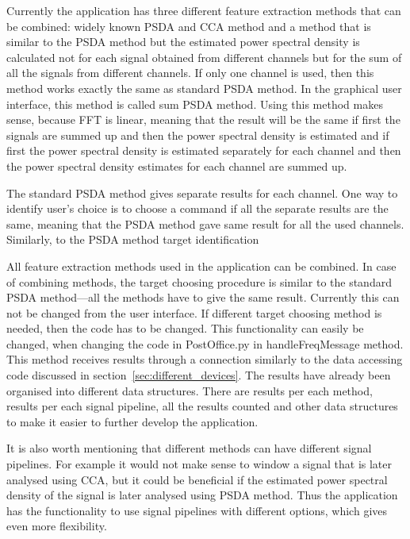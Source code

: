 Currently the application has three different \gls{feature extraction} methods that can be combined: widely known \gls{PSDA} and \gls{CCA} method and a method that is similar to the \gls{PSDA} method but the estimated \gls{power spectral density} is calculated not for each signal obtained from different channels but for the sum of all the signals from different channels. If only one channel is used, then this method works exactly the same as standard \gls{PSDA} method. In the graphical user interface, this method is called sum \gls{PSDA} method. Using this method makes sense, because \gls{FFT} is linear, meaning that the result will be the same if first the signals are summed up and then the \gls{power spectral density} is estimated and if first the \gls{power spectral density} is estimated separately for each channel and then the \gls{power spectral density} estimates for each channel are summed up.

The standard \gls{PSDA} method gives separate results for each channel. One way to identify user's choice is to choose a command if all the separate results are the same, meaning that the \gls{PSDA} method gave same result for all the used channels. Similarly, to the \gls{PSDA} method \gls{target} identification

All \gls{feature extraction} methods used in the application can be combined. In case of combining methods, the \gls{target} choosing procedure is similar to the standard \gls{PSDA} method---all the methods have to give the same result. Currently this can not be changed from the user interface. If different \gls{target} choosing method is needed, then the code has to be changed. This functionality can easily be changed, when changing the code in PostOffice.py in handleFreqMessage method. This method receives results through a connection similarly to the data accessing code discussed in section~\ref{sec:different_devices}. The results have already been organised into different data structures. There are results per each method, results per each signal pipeline, all the results counted and other data structures to make it easier to further develop the application.

It is also worth mentioning that different methods can have different signal pipelines. For example it would not make sense to \gls{window} a signal that is later analysed using \gls{CCA}, but it could be beneficial if the estimated \gls{power spectral density} of the signal is later analysed using \gls{PSDA} method. Thus the application has the functionality to use signal pipelines with different options, which gives even more flexibility.

